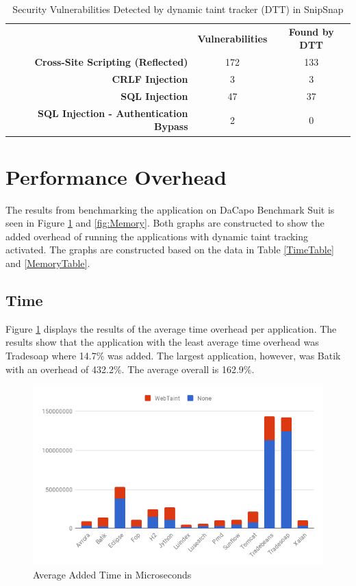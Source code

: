 \begin{table}[H]
  \centering
  \caption{Security Vulnerabilities Detected by dynamic taint tracker (DTT) in SnipSnap}
  \label{table:SnipSnapTable}
  \begin{tabular}{rcc}
    & \textbf{Vulnerabilities} & \textbf{Found by DTT} \\
    \textbf{Cross-Site Scripting (Reflected)}      & 172           & 133  \\
    \textbf{CRLF Injection}                        & 3             & 3    \\
    \textbf{SQL Injection}                         & 47            & 37   \\
    \textbf{SQL Injection - Authentication Bypass} & 2             & 0       
  \end{tabular}
\end{table}



\section{Performance Overhead}
\label{Performance}
The results from benchmarking the application on DaCapo Benchmark Suit \parencite{dacapo} is seen in Figure \ref{fig:Time} and \ref{fig:Memory}. Both graphs are constructed to show the added overhead of running the applications with dynamic taint tracking activated. The graphs are constructed based on the data in Table \ref{TimeTable} and \ref{MemoryTable}.



\subsection{Time}
Figure \ref{fig:Time} displays the results of the average time overhead per application. The results show that the application with the least average time overhead was Tradesoap where 14.7\% was added. The largest application, however, was Batik with an overhead of 432.2\%. The average overall is 162.9\%.

\begin{figure}[H]
    \centering
    \includegraphics[width=\textwidth]{images/Time.png}
    \caption{Average Added Time in Microseconds}
    \label{fig:Time}
\end{figure}



